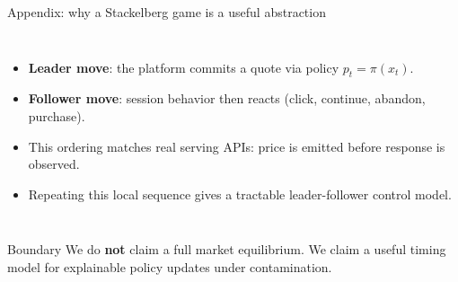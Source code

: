 \begin{frame}{Appendix: why a Stackelberg game is a useful abstraction}
  \footnotesize
  \begin{columns}[T,onlytextwidth]
    \begin{itemize}
      \item \textbf{Leader move}: the platform commits a quote via policy \(p_t=\pi(x_t)\).
      \item \textbf{Follower move}: session behavior then reacts (click, continue, abandon, purchase).
      \item This ordering matches real serving APIs: price is emitted before response is observed.
      \item Repeating this local sequence gives a tractable leader-follower control model.
    \end{itemize}

    \centering
  \end{columns}
  \begin{alertblock}{Boundary}
    We do \textbf{not} claim a full market equilibrium. We claim a useful timing model for explainable policy updates under contamination.
  \end{alertblock}
\end{frame}

